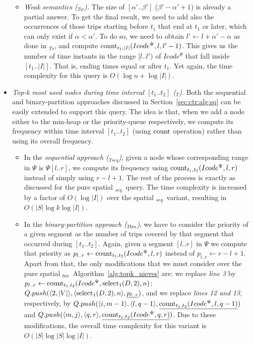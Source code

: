 \begin{itemize}
\begin{itemize}
			
			\item {\em Weak semantics (\XtoY$_{Tw}$).}
			The size of $[\alpha'..\beta']$ ($\beta' - \alpha' + 1$) is already a partial answer. To get the final result, we need to add 
			also the occurrences of those trips starting before $t_1$ that end at $t_1$ or later, which can only exist if $\alpha<\alpha'$. 
			To do so, we need to obtain $l'\leftarrow l+\alpha'-\alpha$ as done in \XtoY$_{Ts}$, and compute $\operatorname{count}_{t_1, |I|}(Icode^{\Psi},l,l'-1)$. This gives us the number of time instants in the range $[l..l')$ of  $Icode^{\Psi}$ that fall inside $[t_1..|I|]$. 
			That is, ending times equal or after $t_1$. Yet again, the time complexity for this query is $O(\log n + \log|I|)$.
		\end{itemize}
		
		


	\item {\em Top-k most used nodes during  time interval $[t_1..t_2]$ (\topK$_T$).}
	Both the sequential and binary-partition approaches discussed in Section~\ref{sec:ctr:alg:sq} can be easily extended to support this query. The idea is that, when we add a node either to the min-heap or the priority-queue
	respectively, we compute its frequency within time interval $[t_1..t_2]$ (using $\operatorname{count}$ operation) 
	rather than using its overall frequency.

	\begin{itemize}
		\item In the {\em sequential approach (\topK$_{Tseq}$)}, given a node whose corresponding range
		in $\Psi$ is $\Psi[l..r]$, we compute its frequency using $\operatorname{count}_{t_1,t_2}(Icode^{\Psi},l,r)$ instead of simply using  $r-l+1$. 
		The rest of the process is exactly as discussed for the pure spatial \topK$_{seq}$\ query. The time complexity is increased by a factor of $O(\log|I|)$ over the spatial \topK$_{seq}$\ variant, resulting in $O(|S|\log k\log|I|)$.
		
		\item In the {\em binary-partition approach (\topK$_{Tbin}$)}, we have to consider the priority of a
		given segment as the number of trips covered by that segment that occurred during $[t_1..t_2]$. Again, given
		a segment $[l..r]$ in $\Psi$ we compute that priority as $p_{l..r} \leftarrow \operatorname{count}_{t_1,t_2}(Icode^{\Psi},l,r)$ instead of 
		$p_{l..r} \leftarrow  r-l+1$. Apart from
		that, the only modifications that we must consider over the pure spatial \topK$_{bin}$\ Algorithm~\ref{alg:topk_nieves} are:
		we replace \textit{line 3} by $p_{l..r} \leftarrow \operatorname{count}_{t_1,t_2}(Icode^{\Psi},\operatorname{select}_1(D,2),n)$; $Q.push(\langle2, |V|\rangle, \langle \operatorname{select}_1(D,2), n\rangle, \underline{p_{l..r}})$,
		and we replace  \textit{lines 12 and 13}, respectively, by 
		   $ Q.push(\langle i, m-1 \rangle, \langle l, q-1 \rangle, \underline{\operatorname{count}_{t_1,t_2}(Icode^{\Psi},l,q-1)})$ and
		   $ Q.push(\langle m,   j \rangle, \langle q,   r \rangle, \underline{\operatorname{count}_{t_1,t_2}(Icode^{\Psi},q,r)})$. Due to these modifications, the overall time complexity for this variant is $O(|S|\log|S|\log|I|)$.
		

\end{itemize}
\end{itemize}
